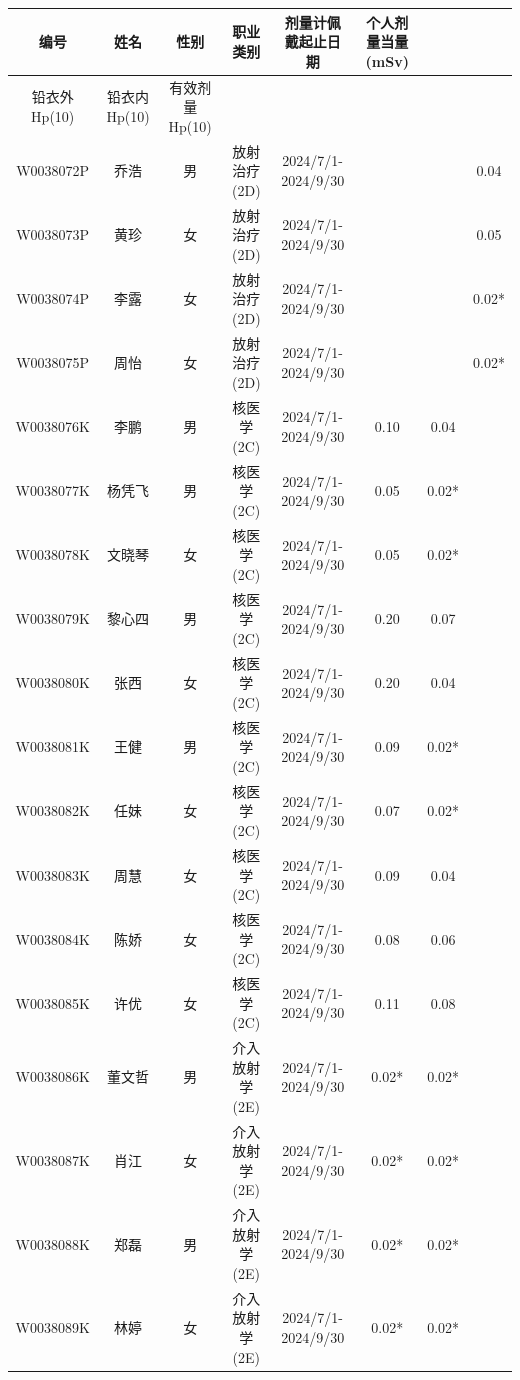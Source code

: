 \begin{table}[H]
\centering
\begin{tabular}{|c|c|c|c|c|c|c|c|}
\hline
编号 & 姓名 & 性别 & 职业类别 & 剂量计佩戴起止日期 & 个人剂量当量(mSv) &  &  \\
\hline
铅衣外Hp(10) & 铅衣内Hp(10) & 有效剂量Hp(10) &  &  &  &  &  \\
\hline
W0038072P & 乔浩 & 男 & 放射治疗(2D) & 2024/7/1-2024/9/30 &  &  & 0.04 \\
\hline
W0038073P & 黄珍 & 女 & 放射治疗(2D) & 2024/7/1-2024/9/30 &  &  & 0.05 \\
\hline
W0038074P & 李露 & 女 & 放射治疗(2D) & 2024/7/1-2024/9/30 &  &  & 0.02* \\
\hline
W0038075P & 周怡 & 女 & 放射治疗(2D) & 2024/7/1-2024/9/30 &  &  & 0.02* \\
\hline
W0038076K & 李鹏 & 男 & 核医学(2C) & 2024/7/1-2024/9/30 & 0.10 & 0.04 &  \\
\hline
W0038077K & 杨凭飞 & 男 & 核医学(2C) & 2024/7/1-2024/9/30 & 0.05 & 0.02* &  \\
\hline
W0038078K & 文晓琴 & 女 & 核医学(2C) & 2024/7/1-2024/9/30 & 0.05 & 0.02* &  \\
\hline
W0038079K & 黎心四 & 男 & 核医学(2C) & 2024/7/1-2024/9/30 & 0.20 & 0.07 &  \\
\hline
W0038080K & 张西 & 女 & 核医学(2C) & 2024/7/1-2024/9/30 & 0.20 & 0.04 &  \\
\hline
W0038081K & 王健 & 男 & 核医学(2C) & 2024/7/1-2024/9/30 & 0.09 & 0.02* &  \\
\hline
W0038082K & 任妹 & 女 & 核医学(2C) & 2024/7/1-2024/9/30 & 0.07 & 0.02* &  \\
\hline
W0038083K & 周慧 & 女 & 核医学(2C) & 2024/7/1-2024/9/30 & 0.09 & 0.04 &  \\
\hline
W0038084K & 陈娇 & 女 & 核医学(2C) & 2024/7/1-2024/9/30 & 0.08 & 0.06 &  \\
\hline
W0038085K & 许优 & 女 & 核医学(2C) & 2024/7/1-2024/9/30 & 0.11 & 0.08 &  \\
\hline
W0038086K & 董文哲 & 男 & 介入放射学(2E) & 2024/7/1-2024/9/30 & 0.02* & 0.02* &  \\
\hline
W0038087K & 肖江 & 女 & 介入放射学(2E) & 2024/7/1-2024/9/30 & 0.02* & 0.02* &  \\
\hline
W0038088K & 郑磊 & 男 & 介入放射学(2E) & 2024/7/1-2024/9/30 & 0.02* & 0.02* &  \\
\hline
W0038089K & 林婷 & 女 & 介入放射学(2E) & 2024/7/1-2024/9/30 & 0.02* & 0.02* &  \\

\end{tabular}
\end{table}
